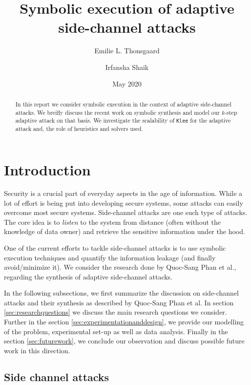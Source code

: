 \documentclass[11pt,a4paper,notitlepage]{article}
\title{Symbolic execution of adaptive side-channel attacks}
\author{Emilie L. Thonsgaard \and Irfansha Shaik}
\date{May 2020}
\begin{document}
\begin{titlingpage}
    \maketitle
    \begin{abstract}
        In this report we consider symbolic execution in the context of adaptive side-channel attacks. We breifly discuss the recent work on symbolic synthesis and model our $k$-step adaptive attack on that basis. We investigate the scalability of \texttt{Klee} for the adaptive attack and, the role of heuristics and solvers used.
    \end{abstract}
\end{titlingpage}

\tableofcontents
\newpage

\section{Introduction}
\label{cha:introduction}

Security is a crucial part of everyday aspects in the age of information.
While a lot of effort is being put into developing secure systems, some attacks can easily overcome most secure systems.
Side-channel attacks are one such type of attacks. The core idea is to \emph{listen} to the system from distance (often without the knowledge of data owner) and retrieve the sensitive information under the hood.

One of the current efforts to tackle side-channel attacks is to use symbolic execution techniques and quantify the information leakage (and finally avoid/minimize it).
We consider the research done by Quoc-Sang Phan et al., \cite{phan2017synthesis} regarding the synthesis of adaptive side-channel attacks.

In the following subsections, we first summarize the discussion on side-channel attacks and their synthesis as described by Quoc-Sang Phan et al. In section \ref{sec:researchquestions} we discuss the main research questions we consider.
Further in the section \ref{sec:experimentationanddesign}, we provide our modelling of the problem, experimental set-up as well as data analysis.
Finally in the section \ref{sec:futurework}, we conclude our observation and discuss possible future work in this direction.

\subsection{Side channel attacks}
\label{sec:sidechannelattacks}
\end{document}
